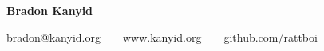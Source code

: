 \begin{center}
    {\LARGE \textbf{Bradon Kanyid}}

    bradon@kanyid.org\ \ \textbullet \ \ www.kanyid.org\ \ \textbullet \ \ github.com/rattboi
\end{center}
